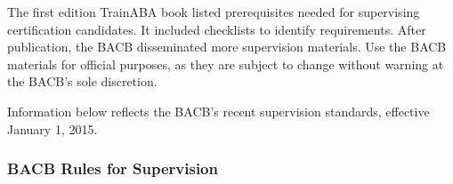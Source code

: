 The first edition TrainABA book listed prerequisites needed for supervising certification candidates. It included checklists to identify requirements. After publication, the BACB\textregistered{} disseminated more supervision materials. Use the BACB\textregistered{} materials for official purposes, as they are subject to change without warning at the BACB\textregistered{}'s sole discretion.


%
Information below reflects the BACB\textregistered{}'s recent supervision standards, effective January 1, 2015.

\subsubsection{BACB\textregistered{} Rules for Supervision}
